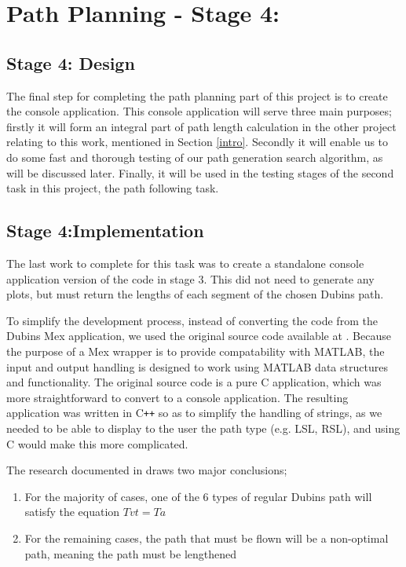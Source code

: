 \section{Path Planning - Stage 4: }
\label{task1:stage4}

\subsection{Stage 4: Design}
\label{task1:stage4:design}

The final step for completing the path planning part of this project is to create the console application. This console application will serve three main purposes; firstly it will form an integral part of path length calculation in the other project relating to this work, mentioned in Section \ref{intro}. Secondly it will enable us to do some fast and thorough testing of our path generation search algorithm, as will be discussed later. Finally, it will be used in the testing stages of the second task in this project, the path following task.

\subsection{Stage 4:Implementation}
\label{task1:stage4:implementation}

The last work to complete for this task was to create a standalone console application version of the code in stage 3. This did not need to generate any plots, but must return the lengths of each segment of the chosen Dubins path. 

To simplify the development process, instead of converting the code from the Dubins Mex application, we used the original source code available at \cite{WalkerDubinsCurves}. Because the purpose of a Mex wrapper is to provide compatability with MATLAB, the input and output handling is designed to work using MATLAB data structures and functionality. The original source code is a pure C application, which was more straightforward to convert to a console application. The resulting application was written in C\texttt{++} so as to simplify the handling of strings, as we needed to be able to display to the user the path type (e.g. LSL, RSL), and using C would make this more complicated. 

The research documented in \cite{mcgee2005optimal} draws two major conclusions;

\begin{enumerate}
	\item For the majority of cases, one of the 6 types of regular Dubins path will satisfy the equation $Tvt = Ta$
	\item For the remaining cases, the path that must be flown will be a non-optimal path, meaning the path must be lengthened 
\end{enumerate}

